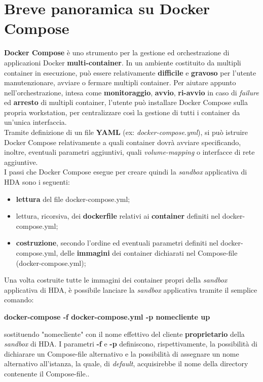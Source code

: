 \section{Breve panoramica su Docker Compose}
\textbf{Docker Compose} è uno strumento per la gestione ed orchestrazione di applicazioni Docker \textbf{multi-container}. In un ambiente costituito da multipli container in esecuzione, può essere relativamente \textbf{difficile} e \textbf{gravoso} per l'utente manutenzionare, avviare o fermare multipli container. Per aiutare appunto nell'orchestrazione, intesa come \textbf{monitoraggio}, \textbf{avvio}, \textbf{ri-avvio} in caso di \textit{failure} ed \textbf{arresto} di multipli container, l'utente può installare Docker Compose sulla propria workstation, per centralizzare così la gestione di tutti i container da un'unica interfaccia.\\
Tramite definizione di un file \textbf{YAML} (ex: \textit{docker-compose.yml}), si può istruire Docker Compose relativamente a quali container dovrà avviare specificando, inoltre, eventuali parametri aggiuntivi, quali \textit{volume-mapping} o interfacce di rete aggiuntive.\\
I passi che Docker Compose esegue per creare quindi la \textit{sandbox} applicativa di HDA sono i seguenti:
\begin{itemize}
	\item \textbf{lettura} del file docker-compose.yml;
	\item lettura, ricorsiva, dei \textbf{dockerfile} relativi ai \textbf{container} definiti nel docker-compose.yml;
	\item \textbf{costruzione}, secondo l'ordine ed eventuali parametri definiti nel docker-compose.yml, delle \textbf{immagini} dei container dichiarati nel Compose-file (docker-compose.yml);
\end{itemize}
Una volta costruite tutte le immagini dei container propri della \textit{sandbox} applicativa di HDA, è possibile lanciare la \textit{sandbox} applicativa tramite il semplice comando: \centerline{\textbf{docker-compose
-f docker-compose.yml -p nomecliente up}} sostituendo "nomecliente" con il nome effettivo del cliente \textbf{proprietario} della \textit{sandbox} di HDA. I parametri \textbf{-f} e \textbf{-p} definiscono, rispettivamente, la possibilità di dichiarare un Compose-file alternativo e la possibilità di assegnare un nome alternativo all'istanza, la quale, di \textit{default}, acquisirebbe il nome della directory contenente il Compose-file..

